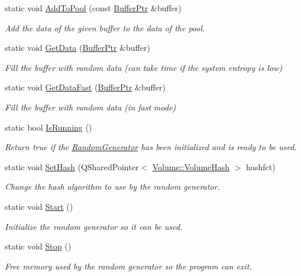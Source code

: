 \begin{DoxyCompactItemize}
\item 
static void \hyperlink{class_gost_crypt_1_1_core_1_1_random_generator_aedad8e5c5552eb470b55793a94b0a441}{Add\+To\+Pool} (const \hyperlink{class_gost_crypt_1_1_buffer_ptr}{Buffer\+Ptr} \&buffer)
\begin{DoxyCompactList}\small\item\em Add the data of the given buffer to the data of the pool. \end{DoxyCompactList}\item 
static void \hyperlink{class_gost_crypt_1_1_core_1_1_random_generator_abbb77e1064c935fc8b86007025afe535}{Get\+Data} (\hyperlink{class_gost_crypt_1_1_buffer_ptr}{Buffer\+Ptr} \&buffer)
\begin{DoxyCompactList}\small\item\em Fill the buffer with random data (can take time if the system entropy is low) \end{DoxyCompactList}\item 
static void \hyperlink{class_gost_crypt_1_1_core_1_1_random_generator_a306aed1c1595e9503bc15bd177d80c54}{Get\+Data\+Fast} (\hyperlink{class_gost_crypt_1_1_buffer_ptr}{Buffer\+Ptr} \&buffer)
\begin{DoxyCompactList}\small\item\em Fill the buffer with random data (in fast mode) \end{DoxyCompactList}\item 
static bool \hyperlink{class_gost_crypt_1_1_core_1_1_random_generator_acd2fafb9fdf7cae694f46726f53bb085}{Is\+Running} ()
\begin{DoxyCompactList}\small\item\em Return true if the \hyperlink{class_gost_crypt_1_1_core_1_1_random_generator}{Random\+Generator} has been initialized and is ready to be used. \end{DoxyCompactList}\item 
static void \hyperlink{class_gost_crypt_1_1_core_1_1_random_generator_a310301edb2ca418f0b8b47ec0b398c3a}{Set\+Hash} (Q\+Shared\+Pointer$<$ \hyperlink{class_gost_crypt_1_1_volume_1_1_volume_hash}{Volume\+::\+Volume\+Hash} $>$ hashfct)
\begin{DoxyCompactList}\small\item\em Change the hash algorithm to use by the random generator. \end{DoxyCompactList}\item 
static void \hyperlink{class_gost_crypt_1_1_core_1_1_random_generator_aab4240cc7c941091e0e02f1e88c6bdcd}{Start} ()
\begin{DoxyCompactList}\small\item\em Initialize the random generator so it can be used. \end{DoxyCompactList}\item 
static void \hyperlink{class_gost_crypt_1_1_core_1_1_random_generator_af1884c6e4c31cf12445857ecacad68d5}{Stop} ()
\begin{DoxyCompactList}\small\item\em Free memory used by the random generator so the program can exit. \end{DoxyCompactList}\end{DoxyCompactItemize}
